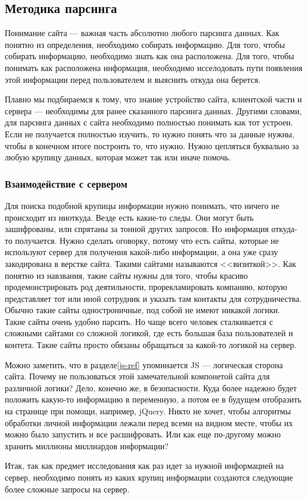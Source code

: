 \subsection{Методика парсинга}
Понимание сайта --- важная часть абсолютно любого парсинга данных. Как понятно из определения, необходимо собирать информацию.
Для того, чтобы собирать информацию, необходимо знать как она расположена.
Для того, чтобы понимать как расположена информация, необходимо исселодовать пути появления этой информации перед пользователем и 
выяснить откуда она берется.

Плавно мы подбираемся к тому, что знание устройство сайта, клиентской части и сервера --- необходимы для ранее сказанного парсинга данных.
Другими словами, для парсинга данных с сайта необходимо полностью понимать как тот устроен. 
Если не получается полностью изучить, то нужно понять что за данные нужны, чтобы в конечном итоге построить то, что нужно.
Нужно цепляться буквально за любую крупицу данных, которая может так или иначе помочь.

\subsubsection{Взаимодействие с сервером}
Для поиска подобной крупицы информации нужно понимать, что ничего не происходит из ниоткуда. Везде есть какие-то следы.
Они могут быть зашифрованы, или спрятаны за тонной других запросов. Но информация откуда-то получается.
Нужно сделать оговорку, потому что есть сайты, которые не используют сервер для получения какой-либо информации, 
а она уже сразу закодирована в верстке сайта. Такими сайтами называются <<визиткой>>.
Как понятно из навзвания, такие сайты нужны для того, чтобы красиво продемонстрировать род деятильности, прорекламировать компанию,
которую представляет тот или иной сотрудник и указать там контакты для сотрудничества.
Обычно такие сайты одностроничные, под собой не имеют никакой логики. Такие сайты очень удобно парсить.
Но чаще всего человек сталкивается с сложными сайтами со сложной логикой, где есть большая база пользователей и контета.
Такие сайты просто обязаны обращаться за какой-то логикой на сервер.

Можно заметить, что в разделе\ref{js-ref} упоминается JS --- логическая сторона сайта. Почему не пользоваться этой замечательной компонетой сайта для различной логики?
Дело, конечно же, в безопасности. Куда более надежно будет положить какую-то информацию в переменную, а потом ее в будущем отобразить на странице при помощи, например, jQuery.
Никто не хочет, чтобы алгоритмы обработки личной информации лежали перед всеми на видном месте, чтобы их можно было запустить и все расшифровать.
Или как еще по-другому можно хранить миллионы миллиардов информации?

Итак, так как предмет исследования как раз идет за нужной информацией на сервер, 
необходимо понять из каких крупиц информации создаются следующие более сложные запросы на сервер.